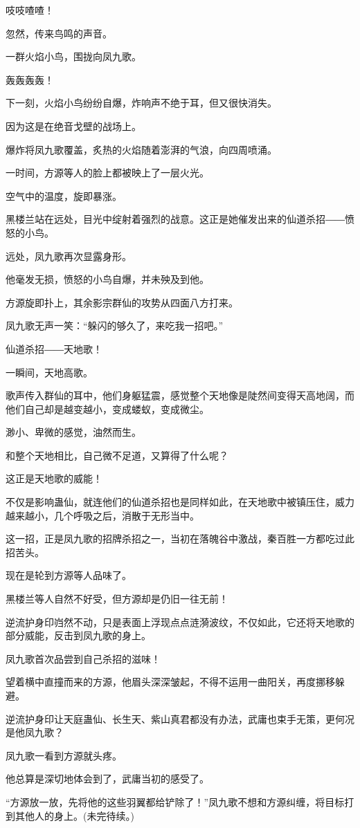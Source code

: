 \begin{this_body}
吱吱喳喳！

忽然，传来鸟鸣的声音。

一群火焰小鸟，围拢向凤九歌。

轰轰轰轰！

下一刻，火焰小鸟纷纷自爆，炸响声不绝于耳，但又很快消失。

因为这是在绝音戈壁的战场上。

爆炸将凤九歌覆盖，炙热的火焰随着澎湃的气浪，向四周喷涌。

一时间，方源等人的脸上都被映上了一层火光。

空气中的温度，旋即暴涨。

黑楼兰站在远处，目光中绽射着强烈的战意。这正是她催发出来的仙道杀招――愤怒的小鸟。

远处，凤九歌再次显露身形。

他毫发无损，愤怒的小鸟自爆，并未殃及到他。

方源旋即扑上，其余影宗群仙的攻势从四面八方打来。

凤九歌无声一笑：“躲闪的够久了，来吃我一招吧。”

仙道杀招――天地歌！

一瞬间，天地高歌。

歌声传入群仙的耳中，他们身躯猛震，感觉整个天地像是陡然间变得天高地阔，而他们自己却是越变越小，变成蝼蚁，变成微尘。

渺小、卑微的感觉，油然而生。

和整个天地相比，自己微不足道，又算得了什么呢？

这正是天地歌的威能！

不仅是影响蛊仙，就连他们的仙道杀招也是同样如此，在天地歌中被镇压住，威力越来越小，几个呼吸之后，消散于无形当中。

这一招，正是凤九歌的招牌杀招之一，当初在落魄谷中激战，秦百胜一方都吃过此招苦头。

现在是轮到方源等人品味了。

黑楼兰等人自然不好受，但方源却是仍旧一往无前！

逆流护身印岿然不动，只是表面上浮现点点涟漪波纹，不仅如此，它还将天地歌的部分威能，反击到凤九歌的身上。

凤九歌首次品尝到自己杀招的滋味！

望着横中直撞而来的方源，他眉头深深皱起，不得不运用一曲阳关，再度挪移躲避。

逆流护身印让天庭蛊仙、长生天、紫山真君都没有办法，武庸也束手无策，更何况是他凤九歌？

凤九歌一看到方源就头疼。

他总算是深切地体会到了，武庸当初的感受了。

“方源放一放，先将他的这些羽翼都给铲除了！”凤九歌不想和方源纠缠，将目标打到其他人的身上。(未完待续。)

\end{this_body}

